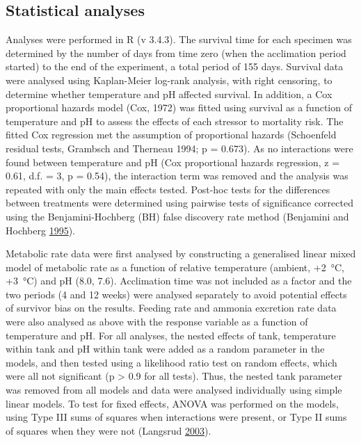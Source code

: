 \documentclass[a4paper,10pt, oneside]{memoir}
\begin{document}
\hypertarget{statistical-analyses}{%
\subsection{Statistical analyses}\label{statistical-analyses}}

Analyses were performed in R (v 3.4.3).
The survival time for each specimen was determined by the number of days from time zero (when the acclimation period started) to the end of the experiment, a total period of 155 days.
Survival data were analysed using Kaplan-Meier log-rank analysis, with right censoring, to determine whether temperature and pH affected survival.
In addition, a Cox proportional hazards model (Cox, 1972) was fitted using survival as a function of temperature and pH to assess the effects of each stressor to mortality risk.
The fitted Cox regression met the assumption of proportional hazards (Schoenfeld residual tests, Grambsch and Therneau 1994; p = 0.673).
As no interactions were found between temperature and pH (Cox proportional hazards regression, z = 0.61, d.f. = 3, p = 0.54), the interaction term was removed and the analysis was repeated with only the main effects tested.
Post-hoc tests for the differences between treatments were determined using pairwise tests of significance corrected using the Benjamini-Hochberg (BH) false discovery rate method (Benjamini and Hochberg \protect\hyperlink{ref-Benjamini1995}{1995}).

Metabolic rate data were first analysed by constructing a generalised linear mixed model of metabolic rate as a function of relative temperature (ambient, +\SI{2}{\celsius}, +\SI{3}{\celsius}) and pH (8.0, 7.6).
Acclimation time was not included as a factor and the two periods (4 and 12 weeks) were analysed separately to avoid potential effects of survivor bias on the results.
Feeding rate and ammonia excretion rate data were also analysed as above with the response variable as a function of temperature and pH.
For all analyses, the nested effects of tank, temperature within tank and pH within tank were added as a random parameter in the models, and then tested using a likelihood ratio test on random effects, which were all not significant (p \textgreater{} 0.9 for all tests).
Thus, the nested tank parameter was removed from all models and data were analysed individually using simple linear models.
To test for fixed effects, ANOVA was performed on the models, using Type III sums of squares when interactions were present, or Type II sums of squares when they were not (Langsrud \protect\hyperlink{ref-Langsrud2003}{2003}).
\end{document}
